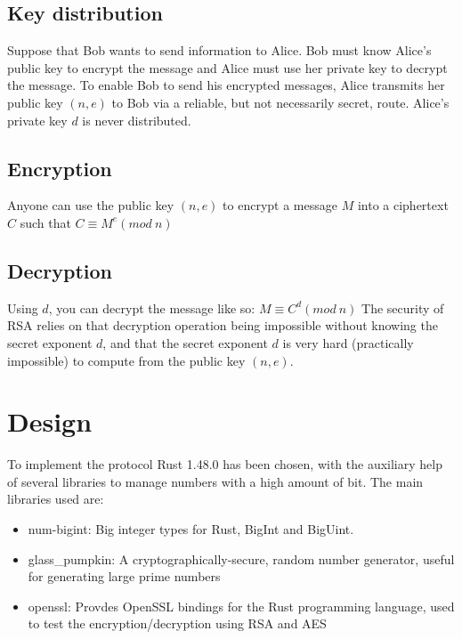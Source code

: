 \documentclass[11pt]{article}
\begin{document}
\subsection{Key distribution}
Suppose that Bob wants to send information to Alice. Bob must know Alice's public key to encrypt the message and Alice must use her private key to decrypt
the message. To enable Bob to send his encrypted messages, Alice transmits her public key $(n, e)$
to Bob via a reliable, but not necessarily secret, route. Alice's private key $d$ is never distributed.
\subsection{Encryption}
Anyone can use the public key $(n, e)$  to encrypt a message $M$ into a ciphertext $C$ such that $C \equiv M^e (mod \ n)$
\subsection{Decryption}
Using $d$, you can decrypt the message like so: $M \equiv C^d (mod \ n)$
The security of RSA relies on that decryption operation being impossible without knowing the secret
exponent $d$, and that the secret exponent $d$ is very hard (practically impossible)
to compute from the public key $(n, e)$.
\section{Design}
To implement the protocol Rust 1.48.0 has been chosen, with the auxiliary help of several libraries to manage numbers with a high
amount of bit. The main libraries used are:
\begin{itemize}
  \item num-bigint: Big integer types for Rust, BigInt and BigUint.
  \item glass\_pumpkin: A cryptographically-secure, random number generator, useful for generating large prime numbers
  \item openssl: Provdes OpenSSL bindings for the Rust programming language, used to test the encryption/decryption using RSA and AES
\end{itemize}
\end{document}
